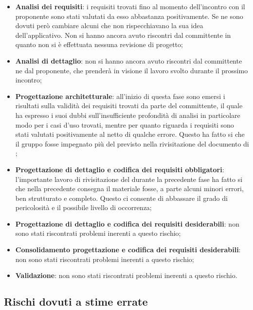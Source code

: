 		\begin{itemize}
			\item \textbf{Analisi dei requisiti}: i requisiti trovati fino al momento dell'incontro con il proponente sono stati valutati da esso abbastanza positivamente. Se ne sono dovuti però cambiare alcuni che non rispecchiavano la sua idea dell'applicativo.  \newline
			Non si hanno ancora avuto riscontri dal committente in quanto non si è effettuata nessuna revisione di progetto;
			\item \textbf{Analisi di dettaglio}: non si hanno ancora avuto riscontri dal committente ne dal proponente, che prenderà in visione il lavoro svolto durante il prossimo incontro;
			\item \textbf{Progettazione architetturale}: all'inizio di questa fase sono emersi i risultati sulla validità dei requisiti trovati da parte del committente, il quale ha espresso i suoi dubbi sull'insufficiente profondità di analisi in particolare modo per i casi d'uso trovati, mentre per quanto riguarda i requisiti sono stati valutati positivamente al netto di qualche errore. Questo ha fatto si che il gruppo fosse impegnato più del previsto nella rivisitazione del documento di \docNameVersionAdR;
			\item \textbf{Progettazione di dettaglio e codifica dei requisiti obbligatori}: l'importante lavoro di rivisitazione del \docNameVersionAdR{} durante la precedente fase ha fatto si che nella precedente consegna il materiale fosse, a parte alcuni minori errori, ben strutturato e completo. Questo ci consente di abbassare il grado di pericolosità e il possibile livello di occorrenza;
			\item \textbf{Progettazione di dettaglio e codifica dei requisiti desiderabili}: non sono stati riscontrati problemi inerenti a questo rischio;
			\item \textbf{Consolidamento progettazione e codifica dei requisiti desiderabili}: non sono stati riscontrati problemi inerenti a questo rischio;
			\item \textbf{Validazione}: non sono stati riscontrati problemi inerenti a questo rischio.
		\end{itemize}


	\subsection{Rischi dovuti a stime errate} %
	\label{sub:rischi_dovuti_a_stime_errate}
